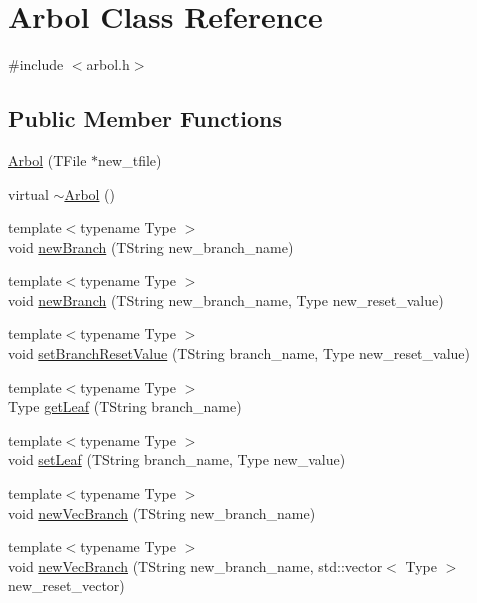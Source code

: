 \hypertarget{classArbol}{}\section{Arbol Class Reference}
\label{classArbol}


{\ttfamily \#include $<$arbol.\+h$>$}

\subsection*{Public Member Functions}
\begin{DoxyCompactItemize}
\item 
\hyperlink{classArbol_a70f09d1535c225d3d8bc565d468ffe56}{Arbol} (T\+File $\ast$new\+\_\+tfile)
\item 
virtual \hyperlink{classArbol_ab9929184ef12844034b5ad4375a09799}{$\sim$\+Arbol} ()
\item 
{\footnotesize template$<$typename Type $>$ }\\void \hyperlink{classArbol_a552622885ffce15f1b1369fe44e729bb}{new\+Branch} (T\+String new\+\_\+branch\+\_\+name)
\item 
{\footnotesize template$<$typename Type $>$ }\\void \hyperlink{classArbol_a5f38b399beb87ec5bf8cb53ff126d501}{new\+Branch} (T\+String new\+\_\+branch\+\_\+name, Type new\+\_\+reset\+\_\+value)
\item 
{\footnotesize template$<$typename Type $>$ }\\void \hyperlink{classArbol_a38f72c5553a435a5b0e37ca55752126c}{set\+Branch\+Reset\+Value} (T\+String branch\+\_\+name, Type new\+\_\+reset\+\_\+value)
\item 
{\footnotesize template$<$typename Type $>$ }\\Type \hyperlink{classArbol_a92be3f8c4258247d65e7f66a8da70453}{get\+Leaf} (T\+String branch\+\_\+name)
\item 
{\footnotesize template$<$typename Type $>$ }\\void \hyperlink{classArbol_a7a8d3bec0bf5c00635a0b00fcd63cf01}{set\+Leaf} (T\+String branch\+\_\+name, Type new\+\_\+value)
\item 
{\footnotesize template$<$typename Type $>$ }\\void \hyperlink{classArbol_a57b6cf7cca6cbb3b75bb0e0333dbe3c8}{new\+Vec\+Branch} (T\+String new\+\_\+branch\+\_\+name)
\item 
{\footnotesize template$<$typename Type $>$ }\\void \hyperlink{classArbol_aee48fcb853b21527bb67d733a7c5b1b3}{new\+Vec\+Branch} (T\+String new\+\_\+branch\+\_\+name, std\+::vector$<$ Type $>$ new\+\_\+reset\+\_\+vector)

\end{DoxyCompactItemize}
